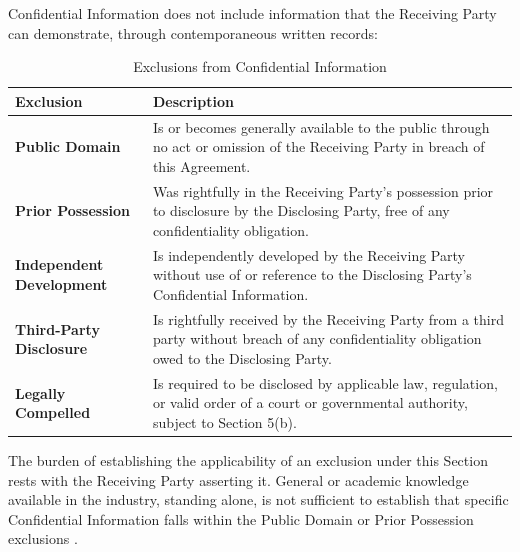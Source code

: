 Confidential Information does not include information that the Receiving Party can demonstrate, through contemporaneous written records:

\begin{table}[h]
  \centering
  \caption{Exclusions from Confidential Information}
  \label{tab:exclusions}
  \begin{tabularx}{\textwidth}{>{\bfseries}l X}
    \toprule
    \rowcolor{mndabg}
    \textbf{Exclusion} & \textbf{Description} \\
    \midrule
    Public Domain & Is or becomes generally available to the public through no act or omission of the Receiving Party in breach of this Agreement. \\
    Prior Possession & Was rightfully in the Receiving Party's possession prior to disclosure by the Disclosing Party, free of any confidentiality obligation. \\
    Independent Development & Is independently developed by the Receiving Party without use of or reference to the Disclosing Party's Confidential Information. \\
    Third-Party Disclosure & Is rightfully received by the Receiving Party from a third party without breach of any confidentiality obligation owed to the Disclosing Party. \\
    Legally Compelled & Is required to be disclosed by applicable law, regulation, or valid order of a court or governmental authority, subject to Section 5(b). \\
    \bottomrule
  \end{tabularx}
\end{table}

The burden of establishing the applicability of an exclusion under this Section rests with the Receiving Party asserting it. General or academic knowledge available in the industry, standing alone, is not sufficient to establish that specific Confidential Information falls within the Public Domain or Prior Possession exclusions \cite{pooley2024trade}.
